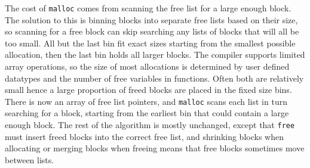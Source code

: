 The cost of \verb|malloc| comes from scanning the free list for a large enough block. The solution to this is binning blocks into separate free lists based on their size, so scanning for a free block can skip searching any lists of blocks that will all be too small. All but the last bin fit exact sizes starting from the smallest possible allocation, then the last bin holds all larger blocks. The compiler supports limited array operations, so the size of most allocations is determined by user defined datatypes and the number of free variables in functions. Often both are relatively small hence a large proportion of freed blocks are placed in the fixed size bins.  
There is now an array of free list pointers, and \verb|malloc| scans each list in turn searching for a block, starting from the earliest bin that could contain a large enough block. The rest of the algorithm is mostly unchanged, except that \verb|free| must insert freed blocks into the correct free list, and shrinking blocks when allocating or merging blocks when freeing means that free blocks sometimes move between lists.


%


